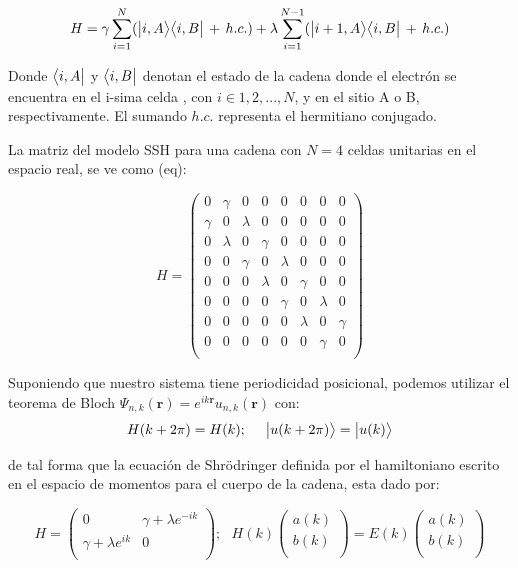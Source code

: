 \begin{equation}
    H = \gamma \sum_{i=1}^N (\big |{i,A}\big \rangle\big \langle{i,B}\big | \,+\, h.c. ) + \lambda \sum_{i=1}^{N-1} (\big |{i + 1,A}\big \rangle\big \langle{i,B}\big | \,+\, h.c. ) 
\end{equation}

Donde $\big \langle{i,A}\big |$ y $\big \langle{i,B}\big |$ denotan el estado de la cadena donde el electrón se encuentra en el i-sima celda , con $i \in {1,2,...,N}$, y en el sitio A o B, respectivamente. El sumando $h.c.$ representa el hermitiano conjugado.

La matriz del modelo SSH para una cadena con $N = 4$ celdas unitarias en el espacio real, se ve como (eq):

\begin{equation}
    H = 
     \begin{pmatrix}
            0 & \gamma & 0 & 0 & 0 & 0 & 0 & 0 \\
            \gamma & 0 & \lambda & 0 & 0 & 0 & 0 & 0 \\
            0 & \lambda & 0 & \gamma & 0 & 0 & 0 & 0 \\
            0 & 0 & \gamma & 0 & \lambda & 0 & 0 & 0 \\
            0 & 0 & 0 & \lambda & 0 & \gamma & 0 & 0 \\
            0 & 0 & 0 & 0 & \gamma & 0 & \lambda & 0 \\
            0 & 0 & 0 & 0 & 0 & \lambda & 0 & \gamma \\
            0 & 0 & 0 & 0 & 0 & 0 & \gamma & 0 \\
            
        \end{pmatrix}
\end{equation}

Suponiendo que nuestro sistema tiene periodicidad posicional, podemos utilizar el teorema de Bloch $\Psi_{n,k}(\mathbf{r}) = e^{i k\mathbf{r}} u_{n,k}(\mathbf{r})$ con:
\begin{equation}
    H(k + 2\pi) = H(k) ; \,\,\,\,\,\,\,\, \big |{u(k + 2\pi)}\big \rangle = \big |{u(k)}\big \rangle 
\end{equation}


de tal forma que la ecuación de Shrödringer definida por el hamiltoniano escrito en el espacio de momentos para el cuerpo de la cadena, esta dado por:

\begin{equation}
    H =      
     \begin{pmatrix}
            0 & \gamma + \lambda e^{-ik}  \\
            \gamma + \lambda e^{ik} & 0  \\
        \end{pmatrix} ; \,\,\,\, H(k) \begin{pmatrix}
            a(k)   \\
            b(k)  \\
        \end{pmatrix} = E(k) \begin{pmatrix}
            a(k)   \\
            b(k)  \\
        \end{pmatrix}
\end{equation}

